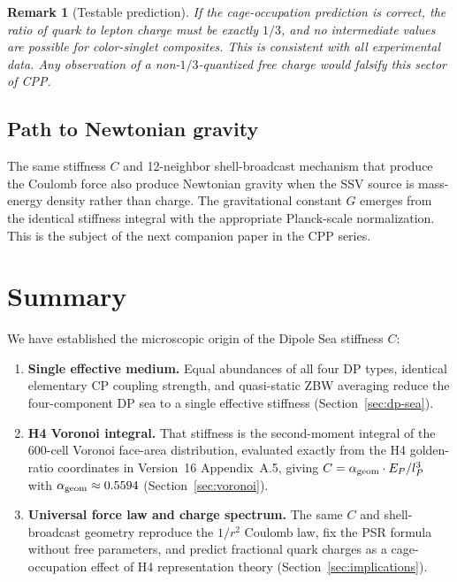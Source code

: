 \documentclass[12pt]{article}
\newtheorem{remark}[theorem]{Remark}
\newcommand{\lP}{l_P}
\newcommand{\EP}{E_P}
\newcommand{\alphageom}{\alpha_{\rm geom}}
\begin{document}
\begin{remark}[Testable prediction]
If the cage-occupation prediction is correct, the ratio of quark to lepton
charge must be exactly $1/3$, and no intermediate values are possible for
color-singlet composites.  This is consistent with all experimental data.
Any observation of a non-$1/3$-quantized free charge would falsify this
sector of CPP.
\end{remark}

\subsection{Path to Newtonian gravity}

The same stiffness $C$ and 12-neighbor shell-broadcast mechanism that produce
the Coulomb force also produce Newtonian gravity when the SSV source is
mass-energy density rather than charge.  The gravitational constant $G$
emerges from the identical stiffness integral with the appropriate
Planck-scale normalization.  This is the subject of the next companion paper
in the CPP series.

\section{Summary}
\label{sec:summary}

We have established the microscopic origin of the Dipole Sea stiffness $C$:

\begin{enumerate}
  \item \textbf{Single effective medium.}  Equal abundances of all four DP
    types, identical elementary CP coupling strength, and quasi-static ZBW
    averaging reduce the four-component DP sea to a single effective stiffness
    (Section~\ref{sec:dp-sea}).

  \item \textbf{H4 Voronoi integral.}  That stiffness is the second-moment
    integral of the 600-cell Voronoi face-area distribution, evaluated exactly
    from the H4 golden-ratio coordinates in Version~16 Appendix~A.5, giving
    $C = \alphageom\cdot\EP/\lP^3$ with $\alphageom \approx 0.5594$
    (Section~\ref{sec:voronoi}).

  \item \textbf{Universal force law and charge spectrum.}  The same $C$ and
    shell-broadcast geometry reproduce the $1/r^2$ Coulomb law, fix the PSR
    formula without free parameters, and predict fractional quark charges as
    a cage-occupation effect of H4 representation theory
    (Section~\ref{sec:implications}).
\end{enumerate}
\end{document}
